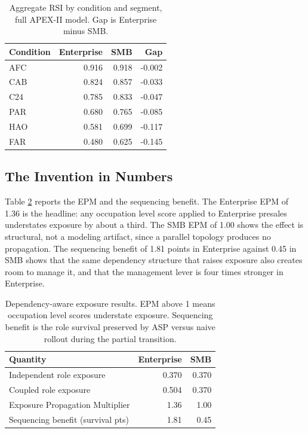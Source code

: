 \documentclass[10pt,conference]{IEEEtran}
\begin{document}
\begin{table}[t]
\caption{Aggregate RSI by condition and segment, full APEX-II model. Gap is Enterprise minus SMB.}
\centering
\begin{tabular}{lrrr}
\toprule
Condition & Enterprise & SMB & Gap \\
\midrule
AFC & 0.916 & 0.918 & -0.002 \\
CAB & 0.824 & 0.857 & -0.033 \\
C24 & 0.785 & 0.833 & -0.047 \\
PAR & 0.680 & 0.765 & -0.085 \\
HAO & 0.581 & 0.699 & -0.117 \\
FAR & 0.480 & 0.625 & -0.145 \\
\bottomrule
\end{tabular}
\label{tab:scenario}
\end{table}

\subsection{The Invention in Numbers}
Table \ref{tab:invention} reports the EPM and the sequencing benefit. The Enterprise EPM of 1.36 is the headline: any occupation level score applied to Enterprise presales understates exposure by about a third. The SMB EPM of 1.00 shows the effect is structural, not a modeling artifact, since a parallel topology produces no propagation. The sequencing benefit of 1.81 points in Enterprise against 0.45 in SMB shows that the same dependency structure that raises exposure also creates room to manage it, and that the management lever is four times stronger in Enterprise.

\begin{table}[t]
\caption{Dependency-aware exposure results. EPM above 1 means occupation level scores understate exposure. Sequencing benefit is the role survival preserved by ASP versus naive rollout during the partial transition.}
\centering
\begin{tabular}{lrr}
\toprule
Quantity & Enterprise & SMB \\
\midrule
Independent role exposure & 0.370 & 0.370 \\
Coupled role exposure & 0.504 & 0.370 \\
Exposure Propagation Multiplier & 1.36 & 1.00 \\
Sequencing benefit (survival pts) & 1.81 & 0.45 \\
\bottomrule
\end{tabular}
\label{tab:invention}
\end{table}
\end{document}
